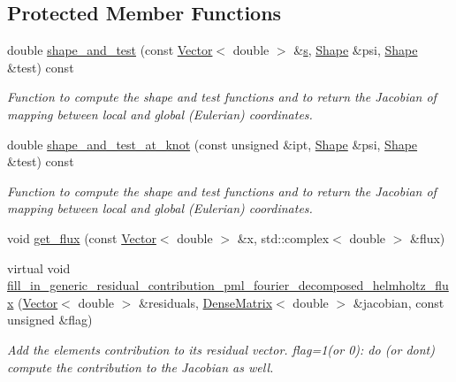\subsection*{Protected Member Functions}
\begin{DoxyCompactItemize}
\item 
double \hyperlink{classoomph_1_1PMLFourierDecomposedHelmholtzFluxElement_a8c440496f9b1b68b057bd2a443ad4005}{shape\+\_\+and\+\_\+test} (const \hyperlink{classoomph_1_1Vector}{Vector}$<$ double $>$ \&\hyperlink{cfortran_8h_ab7123126e4885ef647dd9c6e3807a21c}{s}, \hyperlink{classoomph_1_1Shape}{Shape} \&psi, \hyperlink{classoomph_1_1Shape}{Shape} \&test) const
\begin{DoxyCompactList}\small\item\em Function to compute the shape and test functions and to return the Jacobian of mapping between local and global (Eulerian) coordinates. \end{DoxyCompactList}\item 
double \hyperlink{classoomph_1_1PMLFourierDecomposedHelmholtzFluxElement_a5156a0e6215bd2df2d7eeb4df9ccf0ca}{shape\+\_\+and\+\_\+test\+\_\+at\+\_\+knot} (const unsigned \&ipt, \hyperlink{classoomph_1_1Shape}{Shape} \&psi, \hyperlink{classoomph_1_1Shape}{Shape} \&test) const
\begin{DoxyCompactList}\small\item\em Function to compute the shape and test functions and to return the Jacobian of mapping between local and global (Eulerian) coordinates. \end{DoxyCompactList}\item 
void \hyperlink{classoomph_1_1PMLFourierDecomposedHelmholtzFluxElement_ac4d3e3702156481651c49e1a1241f0bc}{get\+\_\+flux} (const \hyperlink{classoomph_1_1Vector}{Vector}$<$ double $>$ \&x, std\+::complex$<$ double $>$ \&flux)
\item 
virtual void \hyperlink{classoomph_1_1PMLFourierDecomposedHelmholtzFluxElement_a810a3c1e0ef99cf88cfed7e6e4b0d3c1}{fill\+\_\+in\+\_\+generic\+\_\+residual\+\_\+contribution\+\_\+pml\+\_\+fourier\+\_\+decomposed\+\_\+helmholtz\+\_\+flux} (\hyperlink{classoomph_1_1Vector}{Vector}$<$ double $>$ \&residuals, \hyperlink{classoomph_1_1DenseMatrix}{Dense\+Matrix}$<$ double $>$ \&jacobian, const unsigned \&flag)
\begin{DoxyCompactList}\small\item\em Add the element\textquotesingle{}s contribution to its residual vector. flag=1(or 0)\+: do (or don\textquotesingle{}t) compute the contribution to the Jacobian as well. \end{DoxyCompactList}\end{DoxyCompactItemize}
